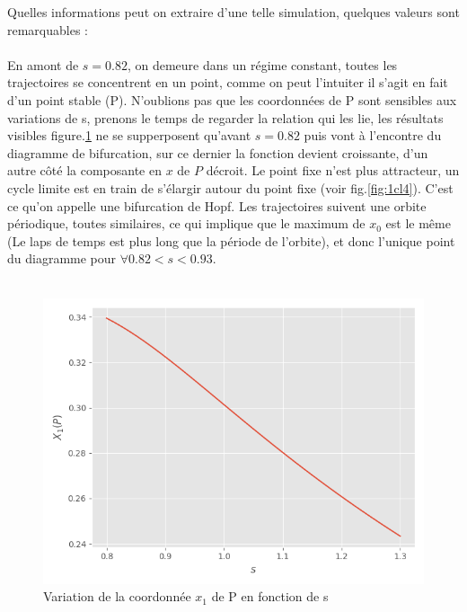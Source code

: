 \documentclass{wsdcr}
\begin{document}
Quelles informations peut on extraire d'une telle simulation, quelques valeurs sont remarquables : 
\\ \\
 En amont de $s=0.82$, on demeure dans un régime constant, toutes les trajectoires se concentrent en un point, comme on peut l'intuiter il s'agit en fait d'un point stable (P). N'oublions pas que les coordonnées de P sont sensibles aux variations de s, prenons le temps de regarder la relation qui les lie, les résultats visibles figure.\ref{fig:x0S} ne se supperposent qu'avant $s=0.82$  puis vont à l'encontre du diagramme de bifurcation, sur ce dernier la fonction devient croissante, d'un autre côté la composante en $x$ de $P$ décroit. Le point fixe n'est plus attracteur, un cycle limite est en train de s'élargir autour du point fixe (voir fig.\ref{fig:1cl4}). C'est ce qu'on appelle une bifurcation de Hopf. Les trajectoires suivent une orbite périodique, toutes similaires, ce qui implique que le maximum de $x_0$ est le même (Le laps de temps est plus long que la période de l'orbite), et donc l'unique point du diagramme pour $\forall 0.82<s<0.93$.  \\ \\
 \begin{figure}
    \centering
    \includegraphics[width=\linewidth]{fig/lv4_x0S.png}
    \caption{Variation de la coordonnée $x_1$ de P en fonction de s}
    \label{fig:x0S}
\end{figure}
\end{document}
